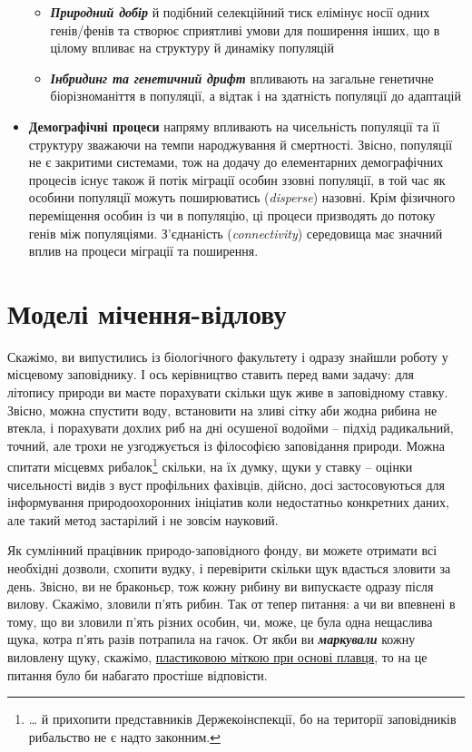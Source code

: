 \documentclass[
  11pt,
]{book}
\begin{document}
\begin{itemize}
  \begin{itemize}
  \item
    \textbf{\emph{Природний добір}} й подібний селекційний тиск елімінує носії одних генів/фенів та створює сприятливі умови для поширення інших, що в цілому впливає на структуру й динаміку популяцій
  \item
    \textbf{\emph{Інбридинг та генетичний дрифт}} впливають на загальне генетичне біорізноманіття в популяції, а відтак і на здатність популяції до адаптацій
  \end{itemize}
\item
  \textbf{Демографічні процеси} напряму впливають на чисельність популяції та її структуру зважаючи на темпи народжування й смертності. Звісно, популяції не є закритими системами, тож на додачу до елементарних демографічних процесів існує також й потік міграції особин ззовні популяції, в той час як особини популяції можуть поширюватись (\emph{disperse}) назовні. Крім фізичного переміщення особин із чи в популяцію, ці процеси призводять до потоку генів між популяціями. З'єднаність (\emph{connectivity}) середовища має значний вплив на процеси міграції та поширення.
\end{itemize}

\section{Моделі мічення-відлову}\label{cmr}

Скажімо, ви випустились із біологічного факультету і одразу знайшли роботу у місцевому заповіднику. І ось керівництво ставить перед вами задачу: для літопису природи ви маєте порахувати скільки щук живе в заповідному ставку. Звісно, можна спустити воду, встановити на зливі сітку аби жодна рибина не втекла, і порахувати дохлих риб на дні осушеної водойми -- підхід радикальний, точний, але трохи не узгоджується із філософією заповідання природи. Можна спитати місцевмх рибалок\footnote{\ldots{} й прихопити представників Держекоінспекції, бо на території заповідників рибальство не є надто законним.} скільки, на їх думку, щуки у ставку -- оцінки чисельності видів з вуст профільних фахівців, дійсно, досі застосовуються для інформування природоохоронних ініціатив коли недостатньо конкретних даних, але такий метод застарілий і не зовсім науковий.

Як сумлінний працівник природо-заповідного фонду, ви можете отримати всі необхідні дозволи, схопити вудку, і перевірити скільки щук вдасться зловити за день. Звісно, ви не браконьєр, тож кожну рибину ви випускаєте одразу після вилову. Скажімо, зловили п'ять рибин. Так от тепер питання: а чи ви впевнені в тому, що ви зловили п'ять різних особин, чи, може, це була одна нещаслива щука, котра п'ять разів потрапила на гачок. От якби ви \textbf{\emph{маркували}} кожну виловлену щуку, скажімо, \href{https://www.littoralsociety.org/fish-tagging.html}{пластиковою міткою при основі плавця}, то на це питання було би набагато простіше відповісти.
\end{document}
